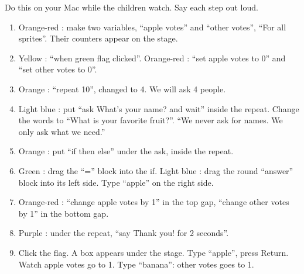 \begin{workedexample}
Do this on your Mac while the children watch. Say each step out loud.
\begin{enumerate}[leftmargin=1.4em,itemsep=1pt]
  \item Orange-red : make two variables, \enquote{apple votes} and \enquote{other votes}, \enquote{For all sprites}. Their counters appear on the stage.
  \item Yellow : \enquote{when green flag clicked}. Orange-red : \enquote{set apple votes to 0} and \enquote{set other votes to 0}.
  \item Orange : \enquote{repeat 10}, changed to 4. We will ask 4 people.
  \item Light blue : put \enquote{ask What's your name? and wait} inside the repeat. Change the words to \enquote{What is your favorite fruit?}. \enquote{We never ask for names. We only ask what we need.}
  \item Orange : put \enquote{if then else} under the ask, inside the repeat.
  \item Green : drag the \enquote{=} block into the if. Light blue : drag the round \enquote{answer} block into its left side. Type \enquote{apple} on the right side.
  \item Orange-red : \enquote{change apple votes by 1} in the top gap, \enquote{change other votes by 1} in the bottom gap.
  \item Purple : under the repeat, \enquote{say Thank you! for 2 seconds}.
  \item Click the flag. A box appears under the stage. Type \enquote{apple}, press Return. Watch apple votes go to 1. Type \enquote{banana}: other votes goes to 1.
\end{enumerate}
\begin{center}
\begin{scratch}[scale=0.85]
\end{scratch}
\end{center}
\end{workedexample}

